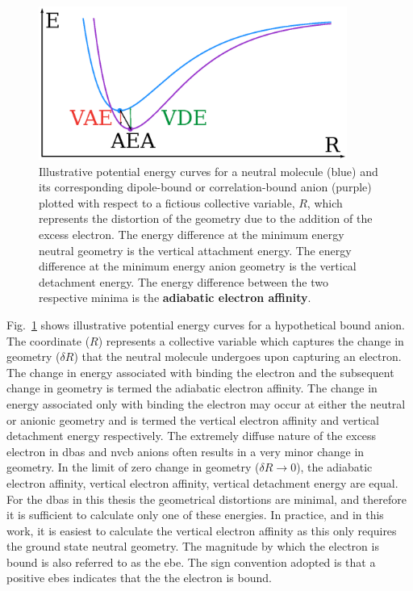 \begin{figure}
	\centering
	\includegraphics[width=0.9\textwidth,keepaspectratio]{Images/chapter1/morse.eps}
    \caption{Illustrative potential energy curves for a neutral molecule (blue) and its corresponding dipole-bound or correlation-bound anion (purple) plotted with respect to a fictious collective variable, $R$, which represents the distortion of the geometry due to the addition of the excess electron. The energy difference at the minimum energy neutral geometry is the vertical attachment energy. The energy difference at the minimum energy anion geometry is the vertical detachment energy. The energy difference between the two respective minima is the \textbf{adiabatic electron affinity}.}
	\label{fig:morse}
\end{figure}

Fig.~\ref{fig:morse} shows illustrative potential energy curves for a hypothetical bound anion.
The coordinate ($R$) represents a collective variable which captures the change in geometry ($\delta R$) that the neutral molecule undergoes upon capturing an electron.
The change in energy associated with binding the electron and the subsequent change in geometry is termed the adiabatic electron affinity.
The change in energy associated only with binding the electron may occur at either the neutral or anionic geometry and is termed the vertical electron affinity and vertical detachment energy respectively.
The extremely diffuse nature of the excess electron in \glspl{dba} and \gls{nvcb} anions often results in a very minor change in geometry.
In the limit of zero change in geometry ($\delta R \rightarrow 0$), the adiabatic electron affinity, vertical electron affinity, vertical detachment energy are equal.
For the \glspl{dba} in this thesis the geometrical distortions are minimal, and therefore it is sufficient to calculate only one of these energies.
In practice, and in this work, it is easiest to calculate the vertical electron affinity as this only requires the ground state neutral geometry.
The magnitude by which the electron is bound is also referred to as the \gls{ebe}.
The sign convention adopted is that a positive \glspl{ebe} indicates that the the electron is bound.
